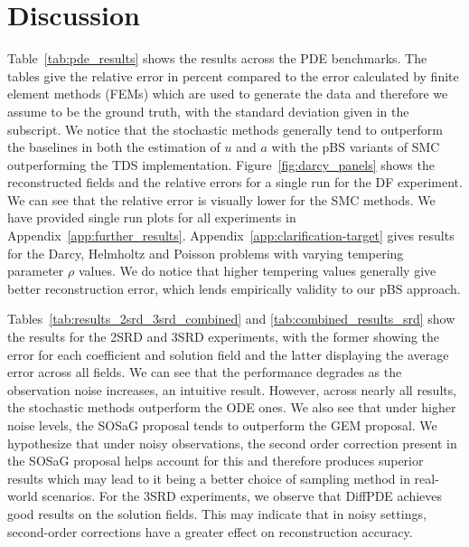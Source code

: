 \section{Discussion}
Table~\ref{tab:pde_results} shows the results across the PDE benchmarks. The tables give the relative error in percent compared to the error calculated by finite element methods (FEMs) which are used to generate the data and therefore we assume to be the ground truth, with the standard deviation given in the subscript. We notice that the stochastic methods generally tend to outperform the baselines in both the estimation of $u$ and $a$ with the pBS variants of SMC outperforming the TDS implementation. Figure~\ref{fig:darcy_panels} shows the reconstructed fields and the relative errors for a single run for the DF experiment. We can see that the relative error is visually lower for the SMC methods. We have provided single run plots for all experiments in Appendix~\ref{app:further_results}.  Appendix~\ref{app:clarification-target} gives results for the Darcy, Helmholtz and Poisson problems with varying tempering parameter $\rho$ values. We do notice that higher tempering values generally give better reconstruction error, which lends empirically validity to our pBS approach.  

Tables~\ref{tab:results_2srd_3srd_combined} and \ref{tab:combined_results_srd} show the results for the 2SRD and 3SRD experiments, with the former showing the error for each coefficient and solution field and the latter displaying the average error across all fields. We can see that the performance degrades as the observation noise increases, an intuitive result. However, across nearly all results, the stochastic methods outperform the ODE ones. We also see that under higher noise levels, the SOSaG proposal tends to outperform the GEM proposal. We hypothesize that under noisy observations, the second order correction present in the SOSaG proposal helps account for this and therefore produces superior results which may lead to it being a better choice of sampling method in real-world scenarios. For the 3SRD experiments, we observe that DiffPDE achieves good results on the solution fields. This may indicate that in noisy settings, second-order corrections have a greater effect on reconstruction accuracy. 


